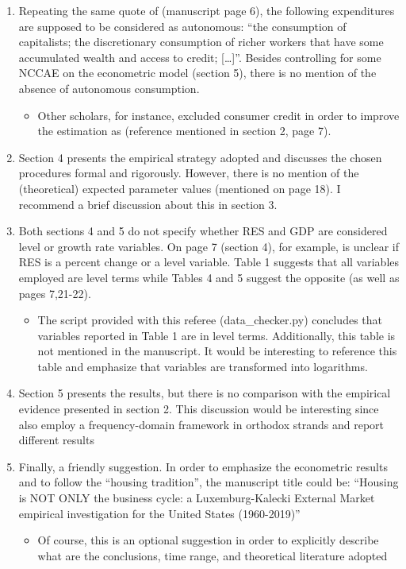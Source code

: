 \documentclass[11pt]{article}
\begin{document}
\begin{enumerate}
\item Repeating the same quote  of \textcite[p.~71]{serrano_long_1995} (manuscript page 6), the following expenditures are supposed to be considered as autonomous: ``the consumption of capitalists; the discretionary consumption of richer workers that have some accumulated wealth and access to credit; [\ldots{}]''. Besides controlling for some  NCCAE on the econometric model (section 5), there is no mention of the absence of autonomous consumption.

\begin{itemize}
\item Other scholars, for instance, excluded consumer credit in order to improve the estimation as \textcite{girardi_long-run_2016} (reference mentioned in section 2, page 7).
\end{itemize}

\item Section 4 presents the empirical strategy adopted and discusses the chosen procedures formal and rigorously.  However, there is no mention of the (theoretical) expected parameter values (mentioned on page 18). I recommend a brief discussion about this in section 3.

\item Both sections 4 and 5 do not specify whether RES and GDP are considered level or growth rate variables. On page 7 (section 4), for example, is unclear if RES is a percent change or a level variable. Table 1 suggests that all variables employed are level terms while Tables 4 and 5 suggest  the opposite (as well as pages 7,21-22).

\begin{itemize}
\item The script provided with this referee (data\_checker.py) concludes that variables reported in Table 1 are in level terms. Additionally, this table is not mentioned in the manuscript. It would be interesting to reference this table and emphasize that variables are transformed into logarithms.
\end{itemize}

\item Section 5 presents the results, but there is no comparison with the empirical evidence presented in section 2. This discussion would be interesting since \textcite{huang_is_2020} also employ a frequency-domain framework in orthodox strands and report different results

\item Finally, a friendly suggestion. In order to emphasize the econometric results and to follow the ``housing tradition'', the manuscript title could be: ``Housing is NOT ONLY the business cycle: a Luxemburg-Kalecki External Market empirical investigation for the United States (1960-2019)''

\begin{itemize}
\item Of course, this is an optional suggestion in order to explicitly describe what are the conclusions, time range, and theoretical literature adopted
\end{itemize}
\end{enumerate}
\end{document}
